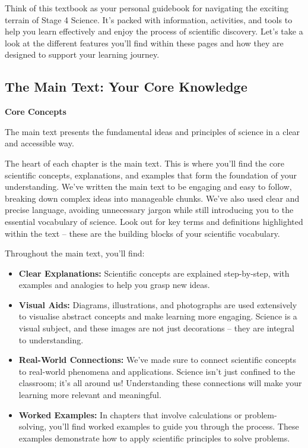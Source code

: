 Think of this textbook as your personal guidebook for navigating the exciting terrain of Stage 4 Science. It's packed with information, activities, and tools to help you learn effectively and enjoy the process of scientific discovery.  Let's take a look at the different features you'll find within these pages and how they are designed to support your learning journey.

\subsection{The Main Text: Your Core Knowledge}

\begin{marginnote}
\textbf{Core Concepts}

The main text presents the fundamental ideas and principles of science in a clear and accessible way.
\end{marginnote}
The heart of each chapter is the main text.  This is where you'll find the core scientific concepts, explanations, and examples that form the foundation of your understanding. We’ve written the main text to be engaging and easy to follow, breaking down complex ideas into manageable chunks.  We’ve also used clear and precise language, avoiding unnecessary jargon while still introducing you to the essential vocabulary of science.  Look out for key terms and definitions highlighted within the text – these are the building blocks of your scientific vocabulary.

Throughout the main text, you’ll find:

\begin{itemize}
    \item \textbf{Clear Explanations:}  Scientific concepts are explained step-by-step, with examples and analogies to help you grasp new ideas.
    \item \textbf{Visual Aids:} Diagrams, illustrations, and photographs are used extensively to visualise abstract concepts and make learning more engaging.  Science is a visual subject, and these images are not just decorations – they are integral to understanding.
    \item \textbf{Real-World Connections:} We’ve made sure to connect scientific concepts to real-world phenomena and applications.  Science isn't just confined to the classroom; it's all around us! Understanding these connections will make your learning more relevant and meaningful.
    \item \textbf{Worked Examples:} In chapters that involve calculations or problem-solving, you'll find worked examples to guide you through the process.  These examples demonstrate how to apply scientific principles to solve problems.
\end{itemize}

